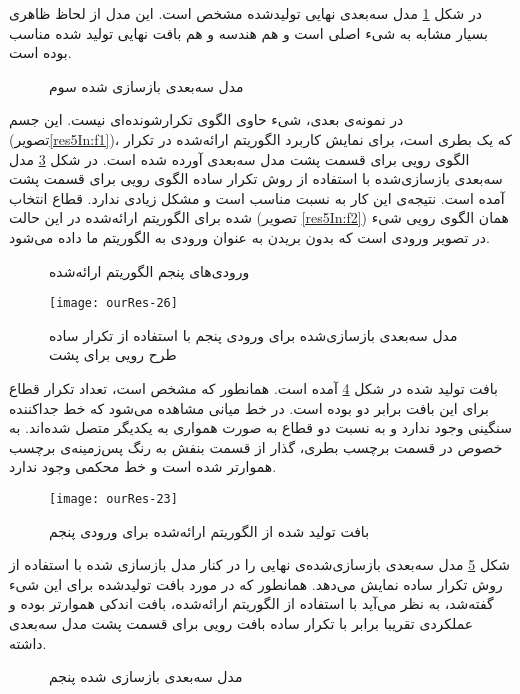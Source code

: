 در شکل \ref{res4_3DOut} مدل سه‌بعدی نهایی تولید‌شده مشخص است. این مدل از لحاظ ظاهری بسیار مشابه به شیء اصلی است و هم هندسه و هم بافت نهایی تولید شده مناسب بوده است.
\begin{figure}[h!]
	\centering
	\qquad
	\caption{مدل سه‌بعدی بازسازی شده سوم}
	\label{res4_3DOut}
\end{figure}
\newline
در نمونه‌ی بعدی، شیء حاوی الگوی تکرارشونده‌ای نیست. این جسم (تصویر\ref{res5In:f1})، که یک بطری است، برای نمایش کاربرد الگوریتم ارائه‌شده در تکرار الگوی رویی برای قسمت پشت مدل سه‌بعدی آورده شده است. در شکل \ref{res5_bad} مدل سه‌بعدی بازسازی‌شده با استفاده از روش تکرار ساده الگوی رویی برای قسمت پشت آمده است. نتیجه‌ی این کار به نسبت مناسب است و مشکل زیادی ندارد. قطاع انتخاب شده برای الگوریتم ارائه‌شده در این حالت (تصویر \ref{res5In:f2}) همان الگوی رویی شیء در تصویر ورودی است که بدون بریدن به عنوان ورودی به الگوریتم ما داده می‌شود. 
\begin{figure}[h!]
	\centering
	\qquad
	\caption{ورودی‌های پنجم الگوریتم ارائه‌شده}
	\label{res5In}
\end{figure}
\begin{figure}[h!]
	\centering
	\texttt{[image: ourRes-26]}
	\caption{مدل سه‌بعدی بازسازی‌شده برای ورودی پنجم با استفاده از تکرار ساده طرح رویی برای پشت}
	\label{res5_bad}
\end{figure}

بافت تولید شده در شکل \ref{res5Out} آمده است. همانطور که مشخص است، تعداد تکرار قطاع برای این بافت برابر دو بوده است. در خط میانی مشاهده می‌شود که خط جداکننده سنگینی وجود ندارد و به نسبت دو قطاع به صورت همواری به یکدیگر متصل شده‌اند. به خصوص در قسمت برچسب بطری، گذار از قسمت بنفش به رنگ پس‌زمینه‌ی برچسب هموارتر شده است و خط محکمی وجود ندارد.
\begin{figure}[h!]
	\centering
	\texttt{[image: ourRes-23]}
	\caption{بافت تولید شده از الگوریتم ارائه‌شده برای ورودی پنجم}
	\label{res5Out}
\end{figure}

شکل \ref{res5_3DOut} مدل سه‌بعدی بازسازی‌شده‌ی نهایی را در کنار مدل بازسازی شده با استفاده از روش تکرار ساده نمایش می‌دهد. همانطور که در مورد بافت تولید‌شده برای این شیء گفته‌شد، به نظر می‌آید با استفاده از الگوریتم ارائه‌شده، بافت اندکی هموارتر بوده و عملکردی تقریبا برابر با تکرار ساده بافت رویی برای قسمت پشت مدل سه‌بعدی داشته.
\begin{figure}[h!]
	\centering
	\qquad
	\caption{مدل سه‌بعدی بازسازی شده پنجم}
	\label{res5_3DOut}
\end{figure}

